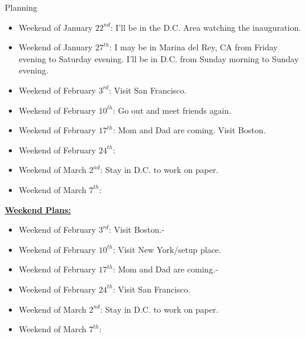 \documentclass[serif, mathserif, final]{beamer}
\newcommand{\te}[1]{\textit{TimeEst:}\textit{#1}}
\newcommand{\dl}[1]{\textit{Deadline:}\textit{#1}}
\begin{document}
\begin{frame}
\begin{columns}
\begin{column}{0.5\textwidth}
\begin{block}{Planning}
\begin{itemize}
\item \tiny Weekend of January $22^{nd}$: I'll be in the D.C. Area watching the inauguration.
\item \tiny Weekend of January $27^{th}$: I may be in Marina del Rey, CA from Friday evening to Saturday evening. I'll be in D.C. from Sunday morning to Sunday evening.
\item \tiny Weekend of February $3^{rd}$: Visit San Francisco. 
\item \tiny Weekend of February $10^{th}$: Go out and meet friends again. 
\item \tiny Weekend of February $17^{th}$: Mom and Dad are coming. Visit Boston. 
\item \tiny Weekend of February $24^{th}$: 
\item \tiny Weekend of March $2^{nd}$: Stay in D.C. to work on paper. 
\item \tiny Weekend of March $7^{th}$: 
\end{itemize}

{\underline{\bf Weekend Plans:}} 
\begin{itemize}
\item \tiny Weekend of February $3^{rd}$: Visit Boston.- 
\item \tiny Weekend of February $10^{th}$: Visit New York/setup place. 
\item \tiny Weekend of February $17^{th}$: Mom and Dad are coming.-
\item \tiny Weekend of February $24^{th}$: Visit San Francisco.
\item \tiny Weekend of March $2^{nd}$: Stay in D.C. to work on paper. 
\item \tiny Weekend of March $7^{th}$:
\end{itemize}
\end{block}
\end{column} %
\end{columns} 
\end{frame} 
\end{document}
